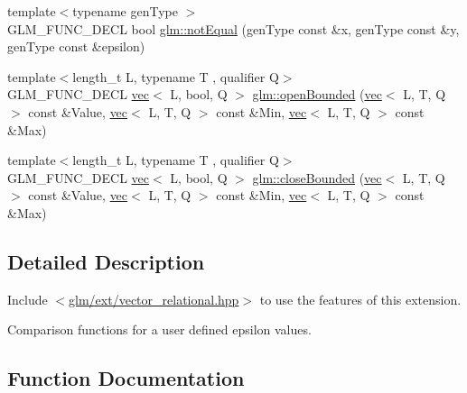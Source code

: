 \begin{DoxyCompactItemize}
\item 
{\footnotesize template$<$typename gen\+Type $>$ }\\G\+L\+M\+\_\+\+F\+U\+N\+C\+\_\+\+D\+E\+CL bool \hyperlink{group__ext__vector__relational_ga27c5118811bcfed5504e50f22693373e}{glm\+::not\+Equal} (gen\+Type const \&x, gen\+Type const \&y, gen\+Type const \&epsilon)
\item 
{\footnotesize template$<$length\+\_\+t L, typename T , qualifier Q$>$ }\\G\+L\+M\+\_\+\+F\+U\+N\+C\+\_\+\+D\+E\+CL \hyperlink{structglm_1_1vec}{vec}$<$ L, bool, Q $>$ \hyperlink{group__ext__vector__relational_gafd303042ba2ba695bf53b2315f53f93f}{glm\+::open\+Bounded} (\hyperlink{structglm_1_1vec}{vec}$<$ L, T, Q $>$ const \&Value, \hyperlink{structglm_1_1vec}{vec}$<$ L, T, Q $>$ const \&Min, \hyperlink{structglm_1_1vec}{vec}$<$ L, T, Q $>$ const \&Max)
\item 
{\footnotesize template$<$length\+\_\+t L, typename T , qualifier Q$>$ }\\G\+L\+M\+\_\+\+F\+U\+N\+C\+\_\+\+D\+E\+CL \hyperlink{structglm_1_1vec}{vec}$<$ L, bool, Q $>$ \hyperlink{group__ext__vector__relational_gab7d89c14c48ad01f720fb5daf8813161}{glm\+::close\+Bounded} (\hyperlink{structglm_1_1vec}{vec}$<$ L, T, Q $>$ const \&Value, \hyperlink{structglm_1_1vec}{vec}$<$ L, T, Q $>$ const \&Min, \hyperlink{structglm_1_1vec}{vec}$<$ L, T, Q $>$ const \&Max)
\end{DoxyCompactItemize}


\subsection{Detailed Description}
Include $<$\hyperlink{ext_2vector__relational_8hpp}{glm/ext/vector\+\_\+relational.\+hpp}$>$ to use the features of this extension.

Comparison functions for a user defined epsilon values. 

\subsection{Function Documentation}
\mbox{\label{group__ext__vector__relational_gab7d89c14c48ad01f720fb5daf8813161}} 
